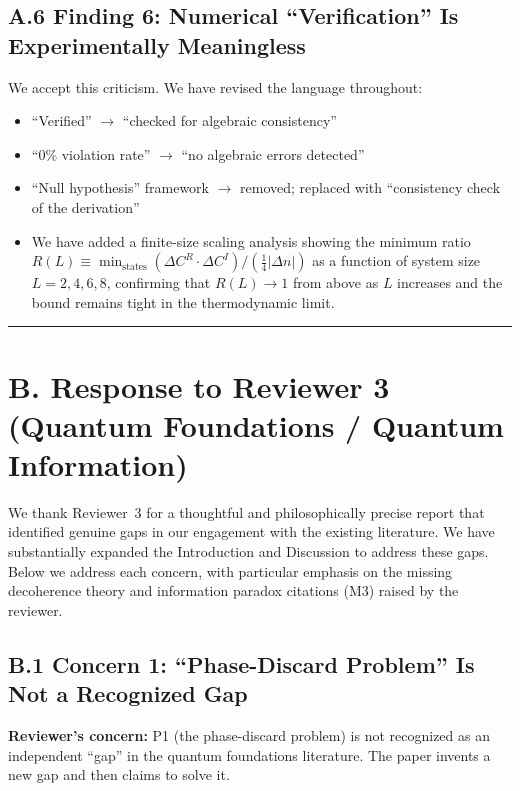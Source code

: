 \documentclass[11pt,a4paper]{article}
\begin{document}
\subsection*{A.6 Finding 6: Numerical ``Verification'' Is Experimentally Meaningless}

We accept this criticism. We have revised the language throughout:

\begin{itemize}[leftmargin=*]
\item ``Verified'' $\to$ ``checked for algebraic consistency''
\item ``0\% violation rate'' $\to$ ``no algebraic errors detected''
\item ``Null hypothesis'' framework $\to$ removed; replaced with ``consistency check of the derivation''
\item We have added a finite-size scaling analysis showing the minimum ratio $R(L) \equiv \min_{\text{states}} (\Delta C^R \cdot \Delta C^I) / (\frac{1}{4}|\Delta n|)$ as a function of system size $L = 2, 4, 6, 8$, confirming that $R(L) \to 1$ from above as $L$ increases and the bound remains tight in the thermodynamic limit.
\end{itemize}

\vspace{1em}
\hrule
\vspace{1em}

\section*{B. Response to Reviewer 3 (Quantum Foundations / Quantum Information)}

We thank Reviewer~3 for a thoughtful and philosophically precise report that identified genuine gaps in our engagement with the existing literature. We have substantially expanded the Introduction and Discussion to address these gaps. Below we address each concern, with particular emphasis on the missing decoherence theory and information paradox citations (M3) raised by the reviewer.

\subsection*{B.1 Concern 1: ``Phase-Discard Problem'' Is Not a Recognized Gap}

\textbf{Reviewer's concern:} P1 (the phase-discard problem) is not recognized as an independent ``gap'' in the quantum foundations literature. The paper invents a new gap and then claims to solve it.
\end{document}
